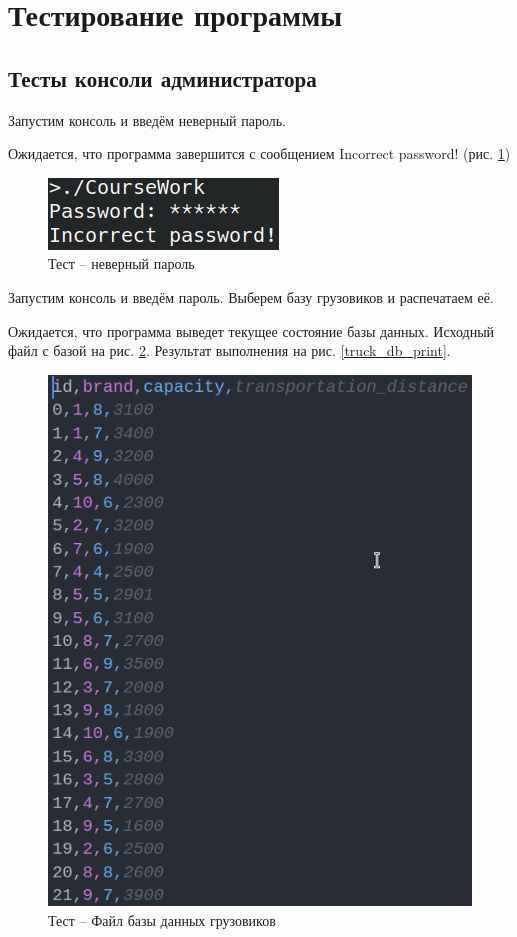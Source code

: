 \section{Тестирование программы}
\setcounter{figure}{0}

\subsection{Тесты консоли администратора}

Запустим консоль и введём неверный пароль.

Ожидается, что программа завершится с сообщением Incorrect password!
(рис. \ref{bad_pass})

\begin{figure}[H]
	\centering
	\includegraphics[width=0.7\linewidth]{photo/tests/admin/bad_pass}
	\caption{Тест -- неверный пароль}
	\label{bad_pass}
\end{figure}

Запустим консоль и введём пароль. Выберем базу грузовиков и распечатаем её.

Ожидается, что программа выведет текущее состояние базы данных.
Исходный файл с базой на рис. \ref{truck_db_state_init}.
Результат выполнения на рис. \ref{truck_db_print}.

\begin{figure}[H]
	\centering
	\includegraphics[width=0.5\linewidth]{photo/tests/admin/truck_db_state_init}
	\caption{Тест -- Файл базы данных грузовиков}
	\label{truck_db_state_init}
\end{figure}

